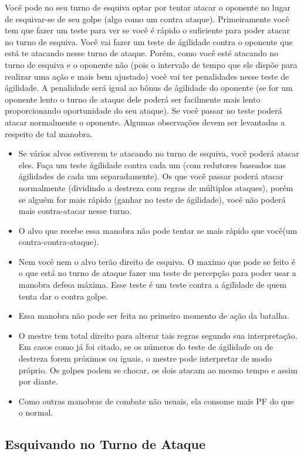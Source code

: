 Você pode no seu turno de esquiva optar por tentar atacar o oponente no lugar de esquivar-se de seu golpe (algo como um contra ataque). Primeiramente você tem que fazer um teste para ver se você é rápido o suficiente para poder atacar no turno de esquiva. Você vai fazer um teste de ágilidade contra o oponente que está te atacando nesse turno de ataque. Porém, como você esté atacando no turno de esquiva e o oponente não (pois o intervalo de tempo que ele dispõe para realizar uma ação e mais bem ajustado) você vai ter penalidades nesse teste de ágilidade. A penalidade será igual ao bônus de ágilidade do oponente (se for um oponente lento o turno de ataque dele poderá ser facilmente mais lento proporcionando oportunidade do seu ataque). Se você passar no teste poderá atacar normalmente o oponente. Algumas observações devem ser levantadas a respeito de tal manobra.
\begin{itemize}
	\item Se vários alvos estiverem te atacando no turno de esquiva, você poderá atacar eles. Faça um teste ágilidade contra cada um (com redutores baseados nas ágilidades de cada um separadamente). Os que você passar poderá atacar normalmente (dividindo a destreza com regras de múltiplos ataques), porém se alguém for mais rápido (ganhar no teste de ágilidade), você não poderá mais contra-atacar nesse turno.
	\item O alvo que recebe essa manobra não pode tentar se mais rápido que você(um contra-contra-ataque).
	\item Nem você nem o alvo terão direito de esquiva. O maximo que pode se feito é o que está no turno de ataque fazer um teste de percepção para poder usar a manobra defesa máxima. Esse teste é um teste contra a ágilidade de quem tenta dar o contra golpe.
	\item Essa manobra não pode ser feita no primeiro momento de ação da batalha.
	\item O mestre tem total direito para alterar tais regras segundo sua interpretação. Em casos como já foi citado, se os números do teste de ágilidade ou de destreza forem próximos ou iguais, o mestre pode interpretar de modo próprio. Os golpes podem se chocar, os dois atacam ao mesmo tempo e assim por diante.
	\item Como outras manobras de combate não usuais, ela consome mais PF do que o normal.
\end{itemize}


\subsection{Esquivando no Turno de Ataque }

